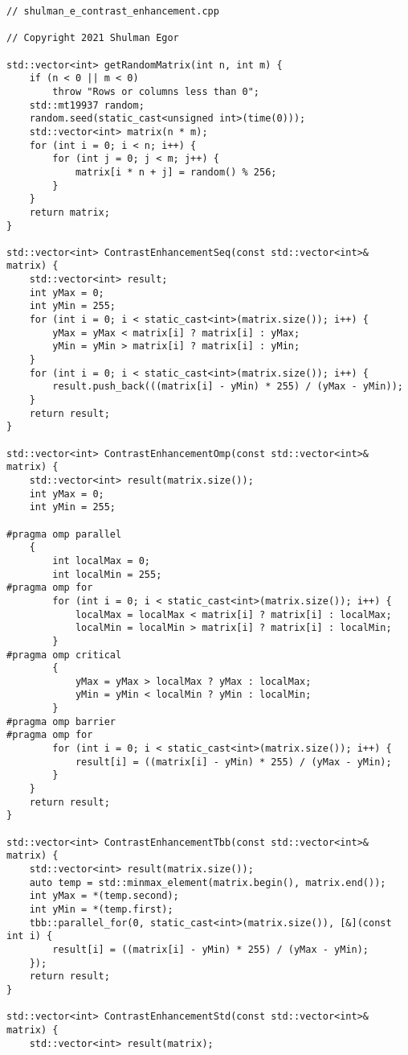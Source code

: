 \documentclass{report}
\begin{document}
\begin{lstlisting}
// shulman_e_contrast_enhancement.cpp

// Copyright 2021 Shulman Egor

std::vector<int> getRandomMatrix(int n, int m) {
    if (n < 0 || m < 0)
        throw "Rows or columns less than 0";
    std::mt19937 random;
    random.seed(static_cast<unsigned int>(time(0)));
    std::vector<int> matrix(n * m);
    for (int i = 0; i < n; i++) {
        for (int j = 0; j < m; j++) {
            matrix[i * n + j] = random() % 256;
        }
    }
    return matrix;
}

std::vector<int> ContrastEnhancementSeq(const std::vector<int>& matrix) {
    std::vector<int> result;
    int yMax = 0;
    int yMin = 255;
    for (int i = 0; i < static_cast<int>(matrix.size()); i++) {
        yMax = yMax < matrix[i] ? matrix[i] : yMax;
        yMin = yMin > matrix[i] ? matrix[i] : yMin;
    }
    for (int i = 0; i < static_cast<int>(matrix.size()); i++) {
        result.push_back(((matrix[i] - yMin) * 255) / (yMax - yMin));
    }
    return result;
}

std::vector<int> ContrastEnhancementOmp(const std::vector<int>& matrix) {
    std::vector<int> result(matrix.size());
    int yMax = 0;
    int yMin = 255;

#pragma omp parallel
    {
        int localMax = 0;
        int localMin = 255;
#pragma omp for
        for (int i = 0; i < static_cast<int>(matrix.size()); i++) {
            localMax = localMax < matrix[i] ? matrix[i] : localMax;
            localMin = localMin > matrix[i] ? matrix[i] : localMin;
        }
#pragma omp critical
        {
            yMax = yMax > localMax ? yMax : localMax;
            yMin = yMin < localMin ? yMin : localMin;
        }
#pragma omp barrier
#pragma omp for
        for (int i = 0; i < static_cast<int>(matrix.size()); i++) {
            result[i] = ((matrix[i] - yMin) * 255) / (yMax - yMin);
        }
    }
    return result;
}

std::vector<int> ContrastEnhancementTbb(const std::vector<int>& matrix) {
    std::vector<int> result(matrix.size());
    auto temp = std::minmax_element(matrix.begin(), matrix.end());
    int yMax = *(temp.second);
    int yMin = *(temp.first);
    tbb::parallel_for(0, static_cast<int>(matrix.size()), [&](const int i) {
        result[i] = ((matrix[i] - yMin) * 255) / (yMax - yMin);
    });
    return result;
}

std::vector<int> ContrastEnhancementStd(const std::vector<int>& matrix) {
    std::vector<int> result(matrix);


\end{lstlisting}
\end{document}
